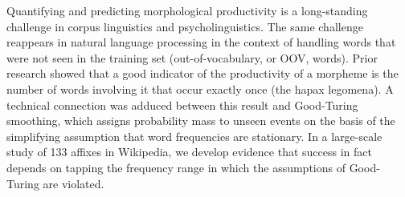 Quantifying and predicting morphological productivity is a long-standing challenge in corpus linguistics and psycholinguistics. The same challenge reappears in natural language processing  in the context of handling words that were not seen in the training set (out-of-vocabulary, or OOV, words). Prior research showed that  a good indicator of the productivity of a morpheme is  the number of words involving it that occur exactly once (the hapax legomena). A technical connection was adduced between this result and Good-Turing smoothing, which assigns probability mass to  unseen events  on the basis of the simplifying assumption that word frequencies are stationary. In a large-scale study of 133 affixes in Wikipedia, we develop evidence that success in fact depends on tapping the frequency range in which the assumptions of Good-Turing are violated.

